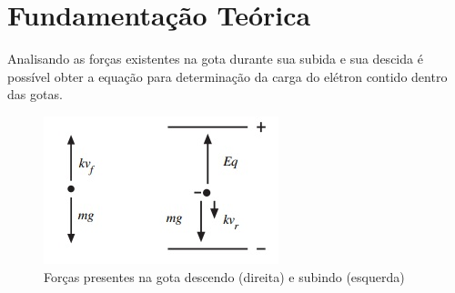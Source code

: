 \section{Fundamentação Teórica}

	Analisando as forças existentes na gota durante sua subida e sua descida é possível obter a equação para determinação da carga do elétron contido dentro das gotas.
 

\begin{figure}[!htb]
	\centering
	\includegraphics[scale= 1.0]{Esquema}		
	\caption{Forças presentes na gota descendo (direita) e subindo (esquerda)}
	\label{im:Esq}
\end{figure}




